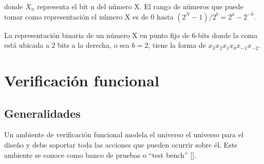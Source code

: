 donde $X_n$ representa el bit n del número X. El rango de números que puede tomar como representación el número X es de 0 hasta $(2^{N}-1)/2^{b}=2^{a}-2^{-b}$.

La representación binaria de un número X en punto fijo de 6-bits donde la coma está ubicada a 2 bits a la derecha, o sea $b=2$, tiene la forma de $x_{3}x_{2}x_{1}x_{0}x_{-1}x_{-2}$.










\section{Verificación funcional}

\subsection{Generalidades}

Un ambiente de verificación funcional modela el universo el universo para el diseño y debe soportar toda las acciones que pueden ocurrir sobre él. Este ambiente se conoce como banco de pruebas o “test bench” [\cite{Wile}].

